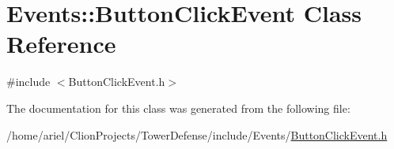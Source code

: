 \hypertarget{classEvents_1_1ButtonClickEvent}{}\section{Events\+:\+:Button\+Click\+Event Class Reference}
\label{classEvents_1_1ButtonClickEvent}


{\ttfamily \#include $<$Button\+Click\+Event.\+h$>$}



The documentation for this class was generated from the following file\+:\begin{DoxyCompactItemize}
\item 
/home/ariel/\+Clion\+Projects/\+Tower\+Defense/include/\+Events/\hyperlink{ButtonClickEvent_8h}{Button\+Click\+Event.\+h}\end{DoxyCompactItemize}

